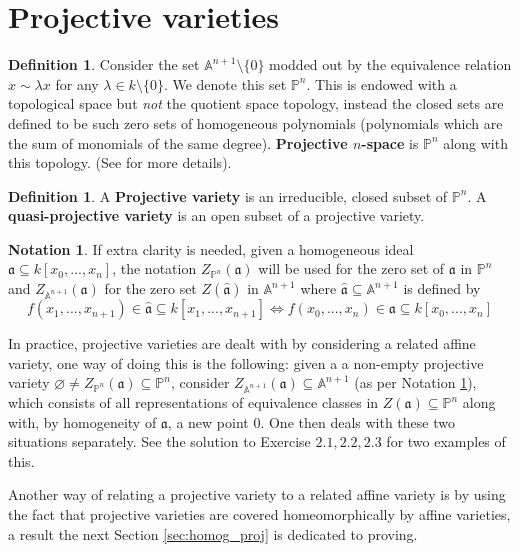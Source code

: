 \documentclass[12pt]{article}
\theoremstyle{plain}
\theoremstyle{definition}
\newtheorem{defn}[thm]{Definition} %
\newtheorem{notation}[thm]{Notation}
\newcommand{\bb}[1]{\mathbb{#1}}
\begin{document}
\section{Projective varieties}
%
\begin{defn}
Consider the set $\bb{A}^{n+1}\setminus\lbrace 0 \rbrace$ modded out by the equivalence relation $x \sim \lambda x$ for any $\lambda \in k\setminus \lbrace 0 \rbrace$. We denote this set $\bb{P}^n$. This is endowed with a topological space but \emph{not} the quotient space topology, instead the closed sets are defined to be such zero sets of homogeneous polynomials (polynomials which are the sum of monomials of the same degree). \textbf{Projective $n$-space} is $\bb{P}^n$ along with this topology. (See \cite{hartshorne} for more details).
\end{defn}
\begin{defn}
A \textbf{Projective variety} is an irreducible, closed subset of $\bb{P}^n$. A \textbf{quasi-projective variety} is an open subset of a projective variety.
\end{defn}
\begin{notation}\label{notation:affine_proj}
If extra clarity is needed, given a homogeneous ideal $\mathfrak{a} \subseteq k[x_0,...,x_n]$, the notation $Z_{\bb{P}^n}(\mathfrak{a})$ will be used for the zero set of $\mathfrak{a}$ in $\bb{P}^n$ and $Z_{\bb{A}^{n+1}}(\mathfrak{a})$ for the zero set $Z(\hat{\mathfrak{a}})$ in $\bb{A}^{n+1}$ where $\hat{\mathfrak{a}} \subseteq \bb{A}^{n+1}$ is defined by
\begin{equation*}
    f(x_1,...,x_{n+1}) \in \hat{\mathfrak{a}} \subseteq k[x_1,...,x_{n+1}] \Longleftrightarrow f(x_0,...,x_n) \in \mathfrak{a} \subseteq k[x_0,...,x_n]
\end{equation*}
\end{notation}
In practice, projective varieties are dealt with by considering a related affine variety, one way of doing this is the following: given a a non-empty projective variety $\varnothing \neq Z_{\bb{P}^n}(\mathfrak{a}) \subseteq \bb{P}^n$, consider $Z_{\bb{A}^{n+1}}(\mathfrak{a})\subseteq \bb{A}^{n+1}$ (as per Notation \ref{notation:affine_proj}), which consists of all representations of equivalence classes in $Z(\mathfrak{a}) \subseteq \bb{P}^n$ along with, by homogeneity of $\mathfrak{a}$, a new point $0$. One then deals with these two situations separately. See the solution to Exercise $2.1,2.2,2.3$ \cite{hartshorne_solutions} for two examples of this.

Another way of relating a projective variety to a related affine variety is by using the fact that projective varieties are covered homeomorphically by affine varieties, a result the next Section \ref{sec:homog_proj} is dedicated to proving.
\end{document}

